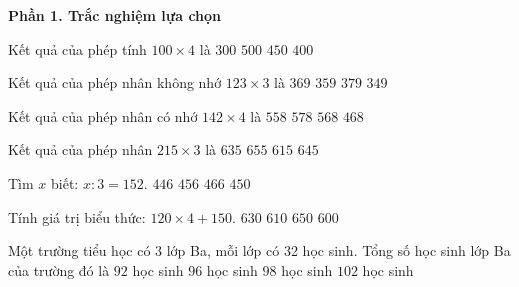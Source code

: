 \textbf{Phần 1. Trắc nghiệm lựa chọn}

\begin{ex} %
Kết quả của phép tính $100 \times 4$ là
\choice
{$300$}
{$500$}
{$450$}
{\True $400$}
\end{ex}

\begin{ex} %
Kết quả của phép nhân không nhớ $123 \times 3$ là
\choice
{\True $369$}
{$359$}
{$379$}
{$349$}
\end{ex}

\begin{ex} %
Kết quả của phép nhân có nhớ $142 \times 4$ là
\choice
{$558$}
{$578$}
{\True $568$}
{$468$}
\end{ex}

\begin{ex} %
Kết quả của phép nhân $215 \times 3$ là
\choice
{$635$}
{$655$}
{$615$}
{\True $645$}
\end{ex}

\begin{ex} %
Tìm $x$ biết: $x : 3 = 152$.
\choice
{$446$}
{\True $456$}
{$466$}
{$450$}
\end{ex}

\begin{ex} %
Tính giá trị biểu thức: $120 \times 4 + 150$.
\choice
{\True $630$}
{$610$}
{$650$}
{$600$}
\end{ex}

\begin{ex} %
Một trường tiểu học có 3 lớp Ba, mỗi lớp có 32 học sinh. Tổng số học sinh lớp Ba của trường đó là
\choice
{$92$ học sinh}
{\True $96$ học sinh}
{$98$ học sinh}
{$102$ học sinh}
\end{ex}

